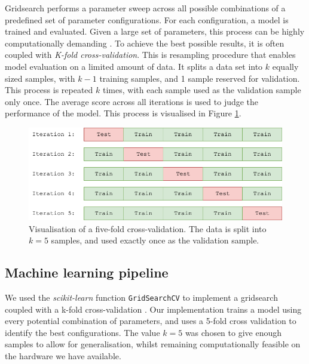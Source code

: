 \documentclass[11pt,conference]{IEEEtran}
\begin{document}
Gridsearch performs a parameter sweep across all possible combinations of a predefined set of parameter configurations. For each configuration, a model is trained and evaluated. Given a large set of parameters, this process can be highly computationally demanding \cite{lerman1980fitting}. To achieve the best possible results, it is often coupled with \textit{K-fold cross-validation}. This is resampling procedure that enables model evaluation on a limited amount of data. It splits a data set into $k$ equally sized samples, with $k-1$ training samples, and 1 sample reserved for validation. This process is repeated $k$ times, with each sample used as the validation sample only once. The average score across all iterations is used to judge the performance of the model. This process is visualised in Figure \ref{fig:five_fold_cv}.

\begin{figure}[htbp]
	\begin{center}
    	\includegraphics[width=\linewidth]{figures/five_fold_cv.png}
	\caption{Visualisation of a five-fold cross-validation. The data is split into $k=5$ samples, and used exactly once as the validation sample. }
	\label{fig:five_fold_cv}
	\end{center}
\end{figure}

\subsection{Machine learning pipeline}

We used the \textit{scikit-learn} function \texttt{GridSearchCV} to implement a gridsearch coupled with a k-fold cross-validation \cite{scikit-gridsearch}. Our implementation trains a model using every potential combination of parameters, and uses a 5-fold cross validation to identify the best configurations. The value $k=5$ was chosen to give enough samples to allow for generalisation, whilst remaining computationally feasible on the hardware we have available.
\end{document}
